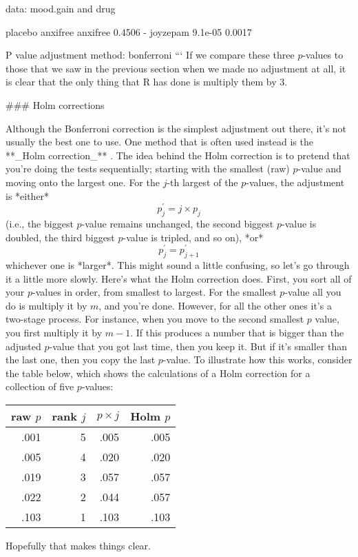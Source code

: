 data:  mood.gain and drug 

         placebo anxifree
anxifree 0.4506  -       
joyzepam 9.1e-05 0.0017  

P value adjustment method: bonferroni 
```
If we compare these three $p$-values to those that we saw in the previous section when we made no adjustment at all, it is clear that the only thing that R has done is multiply them by 3. 

### Holm corrections

Although the Bonferroni correction is the simplest adjustment out there, it's not usually the best one to use. One method that is often used instead is the **_Holm correction_** \cite{Holm1979}. The idea behind the Holm correction is to pretend that you're doing the tests sequentially; starting with the smallest (raw) $p$-value and moving onto the largest one. For the $j$-th largest of the $p$-values, the adjustment is *either*
$$
p^\prime_j = j \times p_j 
$$
(i.e., the biggest $p$-value remains unchanged, the second biggest $p$-value is doubled, the third biggest $p$-value is tripled, and so on), *or*
$$
p^\prime_j = p^\prime_{j+1}
$$
whichever one is *larger*. This might sound a little confusing, so let's go through it a little more slowly. Here's what the Holm correction does. First, you sort all of your $p$-values in order, from smallest to largest. For the smallest $p$-value all you do is multiply it by $m$, and you're done. However, for all the other ones it's a two-stage process. For instance, when you move to the second smallest $p$ value, you first multiply it by $m-1$. If this produces a number that is bigger than the adjusted $p$-value that you got last time, then you keep it. But if it's smaller than the last one, then you copy the last $p$-value. To illustrate how this works, consider the table below, which shows the calculations of a Holm correction for a collection of five $p$-values:
\begin{center}
\begin{tabular}{rrrr} 
 raw $p$ & rank $j$ & $p \times j$ & Holm $p$   \\ \hline
.001 & 5 & .005 & .005 \\
.005 & 4 & .020 & .020 \\
.019 & 3 & .057 & .057 \\
.022 & 2 & .044 & .057 \\
.103 & 1 & .103 & .103 \\
\end{tabular}
\end{center}
Hopefully that makes things clear. 

